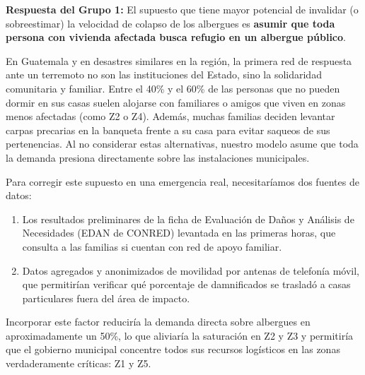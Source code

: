\documentclass[10pt,letterpaper]{article}
\begin{document}
\textbf{Respuesta del Grupo 1:}
El supuesto que tiene mayor potencial de invalidar (o sobreestimar) la velocidad de colapso de los albergues es \textbf{asumir que toda persona con vivienda afectada busca refugio en un albergue público}. 

En Guatemala y en desastres similares en la región, la primera red de respuesta ante un terremoto no son las instituciones del Estado, sino la solidaridad comunitaria y familiar. Entre el 40\% y el 60\% de las personas que no pueden dormir en sus casas suelen alojarse con familiares o amigos que viven en zonas menos afectadas (como Z2 o Z4). Además, muchas familias deciden levantar carpas precarias en la banqueta frente a su casa para evitar saqueos de sus pertenencias. Al no considerar estas alternativas, nuestro modelo asume que toda la demanda presiona directamente sobre las instalaciones municipales.

Para corregir este supuesto en una emergencia real, necesitaríamos dos fuentes de datos:
\begin{enumerate}
    \item Los resultados preliminares de la ficha de Evaluación de Daños y Análisis de Necesidades (EDAN de CONRED) levantada en las primeras horas, que consulta a las familias si cuentan con red de apoyo familiar.
    \item Datos agregados y anonimizados de movilidad por antenas de telefonía móvil, que permitirían verificar qué porcentaje de damnificados se trasladó a casas particulares fuera del área de impacto.
\end{enumerate}
Incorporar este factor reduciría la demanda directa sobre albergues en aproximadamente un 50\%, lo que aliviaría la saturación en Z2 y Z3 y permitiría que el gobierno municipal concentre todos sus recursos logísticos en las zonas verdaderamente críticas: Z1 y Z5.
\end{document}
